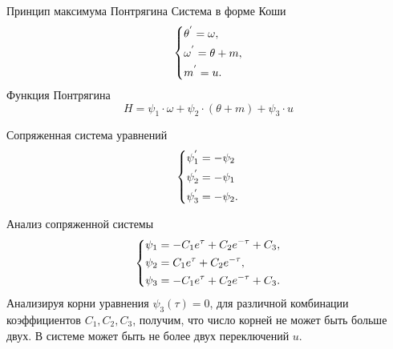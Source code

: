 \documentclass[10pt]{beamer}
\begin{document}
\begin{frame}{Принцип максимума Понтрягина}
	Система в форме Коши
	\begin{equation}\label{koshisystem}
		\left\{ {\begin{aligned}
					 & \theta^{'} = \omega , \hfill   \\
					 & \omega^{'} = \theta+m , \hfill \\
					 & m^{'} = u . \hfill             \\
				\end{aligned}} \right.
	\end{equation}
	Функция Понтрягина
	\[
		H=\psi_1\cdot\omega+\psi_2\cdot(\theta+m)+\psi_3\cdot u
	\]

	Сопряженная система уравнений
	\begin{equation} \label{7}
		\left\{ {\begin{aligned}
					 & \psi^{'}_1  = - \psi_2\hfill     \\
					 & \psi^{'}_2   = - \psi_1\hfill    \\
					 & \psi^{'}_3   = - \psi_2 . \hfill \\
				\end{aligned}} \right.
	\end{equation}

\end{frame}

\begin{frame}{Анализ сопряженной системы}
	\begin{equation}\label{psisystem}
		\left\{ {\begin{aligned}
					 & \psi_1 = -C_1e^\tau+C_2e^{-\tau}+C_3, \hfill  \\
					 & \psi_2 = C_1e^\tau+C_2e^{-\tau} , \hfill      \\
					 & \psi_3 = -C_1e^\tau+C_2e^{-\tau}+C_3 . \hfill \\
				\end{aligned}} \right.
	\end{equation}
	Анализируя корни уравнения $\psi_3(\tau)=0$, для различной комбинации
	коэффициентов $C_1,C_2,C_3$, получим, что число корней не может быть больше двух. В системе может быть не более двух переключений $u$.
\end{frame}
\end{document}
